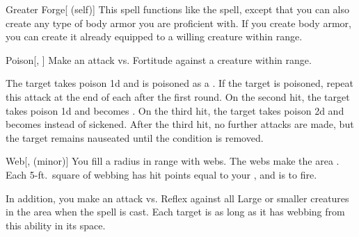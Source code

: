 \lowercase{\hypertarget{spell:Greater Forge}{}}\label{spell:Greater Forge}
\begin{attuneability}[\nth{2}]{\hypertarget{spell:Greater Forge}{Greater Forge}}[ (self)]
This spell functions like the  spell, except that you can also create any type of body armor you are proficient with.
If you create body armor, you can create it already equipped to a willing creature within range.
\end{attuneability}
\vspace{0.25em}



\lowercase{\hypertarget{spell:Poison}{}}\label{spell:Poison}
\begin{freeability}[\nth{2}]{\hypertarget{spell:Poison}{Poison}}[, ]
Make an attack vs. Fortitude against a creature within \rngmed range.

\hit The target takes poison  \minus1d and is poisoned as a .
If the target is poisoned, repeat this attack at the end of each  after the first round.
On the second hit, the target takes poison  \minus1d and becomes .
On the third hit, the target takes poison  \plus2d and becomes  instead of sickened.
After the third hit, no further attacks are made, but the target remains nauseated until the condition is removed.
\end{freeability}
\vspace{0.25em}



\lowercase{\hypertarget{spell:Web}{}}\label{spell:Web}
\begin{freeability}[\nth{2}]{\hypertarget{spell:Web}{Web}}[,  (minor)]
You fill a \areasmall radius  in \rngclose range with webs.
The webs make the area .
Each 5-ft.\ square of webbing has hit points equal to your , and is  to fire.

In addition, you make an attack vs. Reflex against all Large or smaller creatures in the area when the spell is cast.
\hit Each target is  as long as it has webbing from this ability in its space.
\end{freeability}
\vspace{0.25em}



